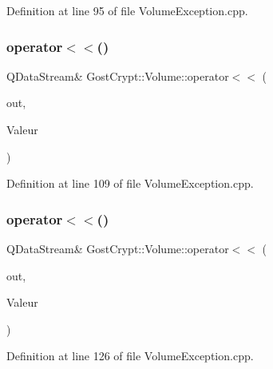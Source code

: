 Definition at line 95 of file Volume\+Exception.\+cpp.

\mbox{\label{namespace_gost_crypt_1_1_volume_a7d3811802ec0a2c4a1391f7da8e828c5}} 
\subsubsection{\texorpdfstring{operator$<$$<$()}{operator<<()}\hspace{0.1cm}{\footnotesize\ttfamily [8/19]}}
{\footnotesize\ttfamily Q\+Data\+Stream\& Gost\+Crypt\+::\+Volume\+::operator$<$$<$ (\begin{DoxyParamCaption}\item[{Q\+Data\+Stream \&}]{out,  }\item[{const \hyperlink{class_gost_crypt_1_1_volume_1_1_volume_not_open}{Gost\+Crypt\+::\+Volume\+::\+Volume\+Not\+Open} \&}]{Valeur }\end{DoxyParamCaption})}



Definition at line 109 of file Volume\+Exception.\+cpp.

\mbox{\label{namespace_gost_crypt_1_1_volume_a6df2c7796fed47c49e12cdabe563cded}} 
\subsubsection{\texorpdfstring{operator$<$$<$()}{operator<<()}\hspace{0.1cm}{\footnotesize\ttfamily [9/19]}}
{\footnotesize\ttfamily Q\+Data\+Stream\& Gost\+Crypt\+::\+Volume\+::operator$<$$<$ (\begin{DoxyParamCaption}\item[{Q\+Data\+Stream \&}]{out,  }\item[{const \hyperlink{class_gost_crypt_1_1_volume_1_1_volume_read_only}{Gost\+Crypt\+::\+Volume\+::\+Volume\+Read\+Only} \&}]{Valeur }\end{DoxyParamCaption})}



Definition at line 126 of file Volume\+Exception.\+cpp.

